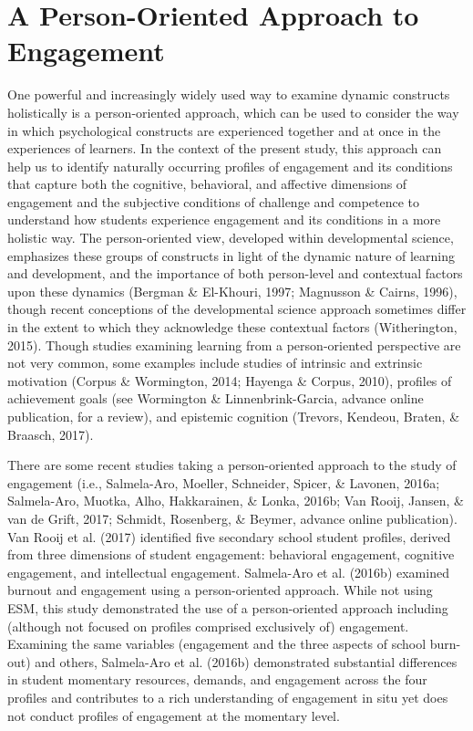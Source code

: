 \documentclass[]{msu-thesis}
\theoremstyle{definition}
\theoremstyle{definition}
\theoremstyle{definition}
\theoremstyle{remark}
\begin{document}
\section{A Person-Oriented Approach to
Engagement}\label{a-person-oriented-approach-to-engagement}

One powerful and increasingly widely used way to examine dynamic
constructs holistically is a person-oriented approach, which can be used
to consider the way in which psychological constructs are experienced
together and at once in the experiences of learners. In the context of
the present study, this approach can help us to identify naturally
occurring profiles of engagement and its conditions that capture both
the cognitive, behavioral, and affective dimensions of engagement and
the subjective conditions of challenge and competence to understand how
students experience engagement and its conditions in a more holistic
way. The person-oriented view, developed within developmental science,
emphasizes these groups of constructs in light of the dynamic nature of
learning and development, and the importance of both person-level and
contextual factors upon these dynamics (Bergman \& El-Khouri, 1997;
Magnusson \& Cairns, 1996), though recent conceptions of the
developmental science approach sometimes differ in the extent to which
they acknowledge these contextual factors (Witherington, 2015). Though
studies examining learning from a person-oriented perspective are not
very common, some examples include studies of intrinsic and extrinsic
motivation (Corpus \& Wormington, 2014; Hayenga \& Corpus, 2010),
profiles of achievement goals (see Wormington \& Linnenbrink-Garcia,
advance online publication, for a review), and epistemic cognition
(Trevors, Kendeou, Braten, \& Braasch, 2017).

There are some recent studies taking a person-oriented approach to the
study of engagement (i.e., Salmela-Aro, Moeller, Schneider, Spicer, \&
Lavonen, 2016a; Salmela-Aro, Muotka, Alho, Hakkarainen, \& Lonka, 2016b;
Van Rooij, Jansen, \& van de Grift, 2017; Schmidt, Rosenberg, \& Beymer,
advance online publication). Van Rooij et al. (2017) identified five
secondary school student profiles, derived from three dimensions of
student engagement: behavioral engagement, cognitive engagement, and
intellectual engagement. Salmela-Aro et al. (2016b) examined burnout and
engagement using a person-oriented approach. While not using ESM, this
study demonstrated the use of a person-oriented approach including
(although not focused on profiles comprised exclusively of) engagement.
Examining the same variables (engagement and the three aspects of school
burn-out) and others, Salmela-Aro et al. (2016b) demonstrated
substantial differences in student momentary resources, demands, and
engagement across the four profiles and contributes to a rich
understanding of engagement in situ yet does not conduct profiles of
engagement at the momentary level.
\end{document}
